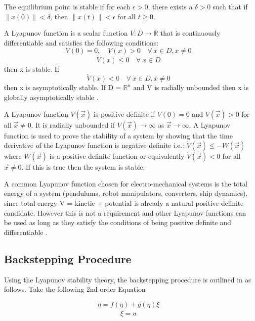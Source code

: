 The equilibrium point is stable if for each $\epsilon > 0$, there exists a $\delta > 0$ such that if $\|x(0)\| < \delta$, then $\|x(t)\| < \epsilon$ for all $t \geq 0$.



 A Lyapunov function is a scalar function $V : D \rightarrow \mathbb{R}$ that is continuously differentiable and satisfies the following conditions:
\begin{equation}
    V(0) = 0, \quad V(x) > 0 \quad \forall \ x \in D, x \neq 0
\end{equation}
\begin{equation}
    \dot{V}(x) \leq 0 \quad \forall \ x \in D
\end{equation}
then x is stable. If
\begin{equation}
    \dot{V}(x) < 0 \quad \forall \ x \in D, x \neq 0
\end{equation}
then x is asymptotically stable. If D = $\mathbb{R}^n$ and V is radially unbounded then x is globally asymptotically stable \cite{khalilNonlinearSystems2002}.

 A Lyapunov function $V(\vec{x})$ is positive definite if $V(0)=0$ and $V(\vec{x})>0$ for all $\vec{x}\neq0$. It is radially unbounded if $V(\vec{x})\rightarrow\infty$ as $\vec{x}\rightarrow\infty$. A Lyapunov function is used to prove the stability of a system by showing that the time derivative of the Lyapunov function is negative definite i.e.: $\dot{V}(\vec{x}) \leq -W(\vec{x})$ where $W(\vec{x})$ is a positive definite function or equivalently $\dot{V}(\vec{x})<0$ for all $\vec{x}\neq0$. If this is true then the system is stable. 

A common Lyapunov function chosen for electro-mechanical systems is the total energy of a system (pendulums, robot manipulators, converters, ship dynamics), since total energy V = kinetic + potential is already a natural positive-definite candidate. However this is not a requirement and other Lyapunov functions can be used as long as they satisfy the conditions of being positive definite and differentiable \cite{khalilNonlinearSystems2002}.
\subsection{Backstepping Procedure}
Using the Lyapunov stability theory, the backstepping procedure is outlined in \cite{khalilNonlinearSystems2002} as follows. Take the following 2nd order Equation 

\begin{equation}
    \dot{\eta} = f(\eta) + g(\eta)\xi \label{eq:1}
\end{equation}
\begin{equation}
    \dot{\xi} = u
\end{equation}

